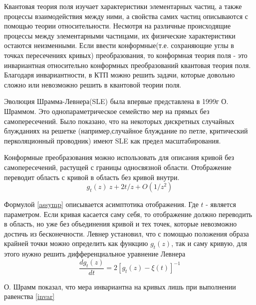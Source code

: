 \documentclass[a4paper]{article}
\begin{document}
	\par Квантовая теория поля изучает характеристики элементарных частиц, а также процессы взаимодействия между ними, а свойства самих частиц описываются с помощью теории относительности. Несмотря на различные происходящие процессы между элементарными частицами, их физические характеристики остаются неизменными. Если ввести конформные(т.е. сохраняющие углы в точках пересечениях кривых) преобразования, то конформная теория поля - это инвариантная относительно конформных преобразований квантовая теория поля. Благодаря инвариантности, в КТП можно решить задачи, которые довольно сложно или невозможно решить в квантовой теории поля.
	
	\par Эволюция Шрамма-Левнера(SLE)  была впервые представлена в 1999г О. Шраммом. Это однопараметрическое семейство мер на прямых без самопересечений. Было показано, что на некоторых дискретных случайных блужданиях на решетке (например,случайное блуждание по петле\cite{looperased}, критический перколяционный проводник\cite{critexplor}) имеют SLE как предел масштабирования. 
	\par Конформные преобразования можно использовать для описания кривой без самопересечений, растущей с границы односвязной области\cite{zatelep}. Отображение переводит область с кривой в область без кривой внутри.
	\begin{equation}\label{assymp}
		g_{t}(z) ~ z + 2t/z + O(1/z^{2})
	\end{equation}
	
	\par Формулой \ref{assymp} описывается асимптотика отображения. Где $t$ - является параметром. Если кривая касается саму себя, то отображение должно переводить в область, но уже без объединения кривой и тех точек, которые невозможно достичь из бесконечности. Левнер установил, что с помощью положения образа крайней точки можно определить как функцию $g_{t}(z)$\cite{lowner}, так и саму кривую, для этого нужно решить дифференциальное уравнение Левнера 
	\begin{equation}\label{sle_eq}
		\dfrac{dg_{t}(z)}{dt} = 2[g_{t}(z)-\xi(t)]^{-1}
	\end{equation}
	\par О. Шрамм показал, что мера инвариантна\cite{shram} на кривых лишь при выполнении равенства \ref{invar}
	
\end{document}
